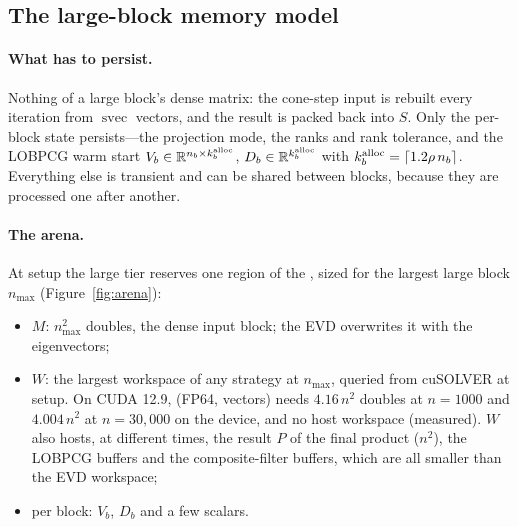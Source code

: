 \documentclass[11pt]{article}
\newcommand{\R}{\mathbb{R}}
\newcommand{\svec}{\operatorname{svec}}
\begin{document}
\subsection{The large-block memory model}\label{sec:large-memory}
\paragraph{What has to persist.} Nothing of a large block's dense matrix: the cone-step input is rebuilt
every iteration from $\svec$ vectors, and the result is packed back into $S$. Only the per-block state
persists---the projection mode, the ranks and rank tolerance, and the LOBPCG warm start
$V_b\in\R^{n_b\times k_b^{\rm alloc}}$, $D_b\in\R^{k_b^{\rm alloc}}$ with
$k_b^{\rm alloc} = \lceil 1.2\rho\, n_b\rceil$. Everything else is transient and can be shared between blocks,
because they are processed one after another.

\paragraph{The arena.} At setup the large tier reserves one region of the , sized for
the largest large block $n_{\max}$ (Figure~\ref{fig:arena}):
\begin{itemize}
  \item $M$: $n_{\max}^2$ doubles, the dense input block; the EVD overwrites it with the eigenvectors;
  \item $W$: the largest workspace of any strategy at $n_{\max}$, queried from cuSOLVER at setup. On CUDA 12.9,
   (FP64, vectors) needs $4.16\,n^2$ doubles at $n = 1000$ and $4.004\,n^2$ at
  $n = 30{,}000$ on the device, and no host workspace (measured). $W$ also hosts, at different times, the
  result $P$ of the final product ($n^2$), the LOBPCG buffers and the composite-filter buffers, which are all
  smaller than the EVD workspace;
  \item per block: $V_b$, $D_b$ and a few scalars.
\end{itemize}
\end{document}
